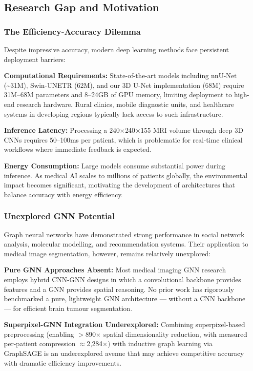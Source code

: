 \subsection{Research Gap and Motivation}

\subsubsection{The Efficiency-Accuracy Dilemma}

Despite impressive accuracy, modern deep learning methods face persistent deployment barriers:

\textbf{Computational Requirements:} State-of-the-art models including nnU-Net (\textasciitilde31M), Swin-UNETR (62M), and our 3D U-Net implementation (68M) require 31M--68M parameters and 8--24GB of GPU memory, limiting deployment to high-end research hardware. Rural clinics, mobile diagnostic units, and healthcare systems in developing regions typically lack access to such infrastructure.

\textbf{Inference Latency:} Processing a 240$\times$240$\times$155 MRI volume through deep 3D CNNs requires 50--100ms per patient, which is problematic for real-time clinical workflows where immediate feedback is expected.

\textbf{Energy Consumption:} Large models consume substantial power during inference. As medical AI scales to millions of patients globally, the environmental impact becomes significant, motivating the development of architectures that balance accuracy with energy efficiency.

\subsubsection{Unexplored GNN Potential}

Graph neural networks have demonstrated strong performance in social network analysis, molecular modelling, and recommendation systems. Their application to medical image segmentation, however, remains relatively unexplored:

\textbf{Pure GNN Approaches Absent:} Most medical imaging GNN research employs hybrid CNN-GNN designs in which a convolutional backbone provides features and a GNN provides spatial reasoning. No prior work has rigorously benchmarked a pure, lightweight GNN architecture — without a CNN backbone — for efficient brain tumour segmentation.

\textbf{Superpixel-GNN Integration Underexplored:} Combining superpixel-based preprocessing (enabling $>$890$\times$ spatial dimensionality reduction, with measured per-patient compression $\approx$2,284$\times$) with inductive graph learning via GraphSAGE is an underexplored avenue that may achieve competitive accuracy with dramatic efficiency improvements.

